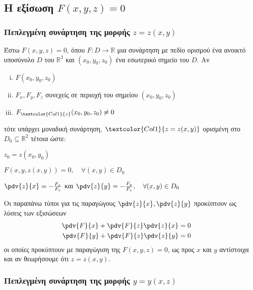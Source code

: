 \documentclass[a4paper,table]{report}
\begin{document}
\subsection{Η εξίσωση \ensuremath{F(x,y,z) = 0}}

\subsubsection{Πεπλεγμένη συνάρτηση της μορφής \ensuremath{z=z(x,y)}}

Έστω $ F(x,y,z) = 0 $, όπου $F\colon D \to \mathbb{R}$ μια συνάρτηση με πεδίο ορισμού 
ένα ανοικτό υποσύνολο $ D $ του $ \mathbb{R}^{3}  $ και $ (x_0,y_0,z_0) $ ένα 
εσωτερικό σημείο του $ D $. Αν
\begin{enumerate}[(i)]
  \item $ F(x_0,y_0,z_0) $
  \item $ F_x, F_y, F_z $ συνεχείς σε περιοχή του σημείου $ (x_0,y_0,z_0) $
  \item $ F_{\textcolor{Col1}{z}}(x_0,y_0,z_0) \neq 0 $
\end{enumerate}
τότε υπάρχει μοναδική συνάρτηση, $ \textcolor{Col1}{z=z(x,y)} $ ορισμένη στο 
$ D_0 \subseteq \mathbb{R}^{2} $ τέτοια ώστε:
\begin{myitemize}
  \item $ z_0 = z(x_0,y_0) $
  \item $ F(x,y,z(x,y)) = 0,  \quad \forall (x,y)\in  D_0 $
  \item $ \pdv{z}{x} = - \frac{F_x}{F_z} $ και $ \pdv{z}{y} = - \frac{F_y}{F_z}, 
    \quad \forall (x,y) \in D_0$
\end{myitemize}

\begin{rem}
  Οι παραπάνω τύποι για τις παραγώγους $ \pdv{z}{x}, \pdv{z}{y} $ προκύπτουν 
  ως λύσεις των εξισώσεων  
  \begin{align*}	
    \pdv{F}{x} + \pdv{F}{z}\pdv{z}{x} &= 0 \\
    \pdv{F}{y} + \pdv{F}{z}\pdv{z}{y} &= 0 
  \end{align*}
  οι οποίες προκύπτουν με παραγώγιση της $ F(x,y,z) = 0 $, ως προς $x$ και $y$ 
  αντίστοιχα και  αν θεωρήσουμε ότι $ z=z(x,y) $.
\end{rem}

\subsubsection{Πεπλεγμένη συνάρτηση της μορφής \ensuremath{y=y(x,z)}}
\end{document}
